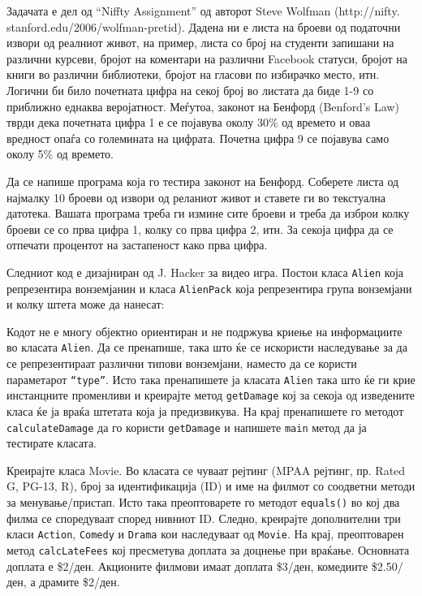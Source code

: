 \begin{questions}
\question
Задачата е дел од ``Niffty Assignment'' од авторот Steve Wolfman (http://nifty.
stanford.edu/2006/wolfman-pretid). Дадена ни е листа на броеви од податочни
извори од реалниот живот, на пример, листа со број на студенти запишани на
различни курсеви, бројот на коментари на различни Facebook статуси, бројот на
книги во различни библиотеки, бројот на гласови по избирачко место, итн. Логични
би било почетната цифра на секој број во листата да биде 1-9 со приближно 
еднаква веројатност. Меѓутоа, законот на Бенфорд (Benford’s Law) тврди дека
почетната цифра 1 е се појавува околу 30\% од времето и оваа вредност опаѓа со
големината на цифрата. Почетна цифра 9 се појавува само околу 5\% од времето.

Да се напише програма која го тестира законот на Бенфорд. Соберете листа од
најмалку 10 броеви од извори од реланиот живот и ставете ги во текстуална
датотека. Вашата програма треба ги измине сите броеви и треба да изброи колку
броеви се со прва цифра 1, колку со прва цифра 2, итн. За секоја цифра да се
отпечати процентот на застапеност како прва цифра.



\question
Следниот код е дизајниран од J. Hacker за видео игра. Постои класа \texttt{Alien} која
репрезентира вонземјанин и класа \texttt{AlienPack} која репрезентира група вонземјани и
колку штета може да нанесат:



Кодот не е многу објектно ориентиран и не подржува криење на информациите во
класата \texttt{Alien}. Да се пренапише, така што ќе се искористи наследување за
да се репрезентираат различни типови вонземјани, наместо да се користи
параметарот \texttt{``type''}. Исто така пренапишете ја класата \texttt{Alien}
така што ќе ги крие инстанцните променливи и креирајте метод \texttt{getDamage}
кој за секоја од изведените класа ќе ја враќа штетата која ја предизвикува. На
крај пренапишете го методот \texttt{calculateDamage} да го користи
\texttt{getDamage} и напишете \texttt{main} метод да ја тестирате класата.

\question
Креирајте класа Movie. Во класата се чуваат рејтинг (MPAA рејтинг, пр. Rated G,
PG-13, R), број за идентификација (ID) и име на филмот со соодветни методи за
менување/пристап. Исто така преоптоварете го методот \texttt{equals()} во кој
два филма се споредуваат според нивниот ID. Следно, креирајте дополнителни три
класи \texttt{Action}, \texttt{Comedy} и \texttt{Drama} кои наследуваат од
\texttt{Movie}. На крај, преоптоварен метод \texttt{calcLateFees} кој пресметува
доплата за доцнење при враќање. Основната доплата е \$2/ден. Акционите филмови
имаат доплата \$3/ден, комедиите \$2.50/ден, а драмите \$2/ден.

\end{questions}


